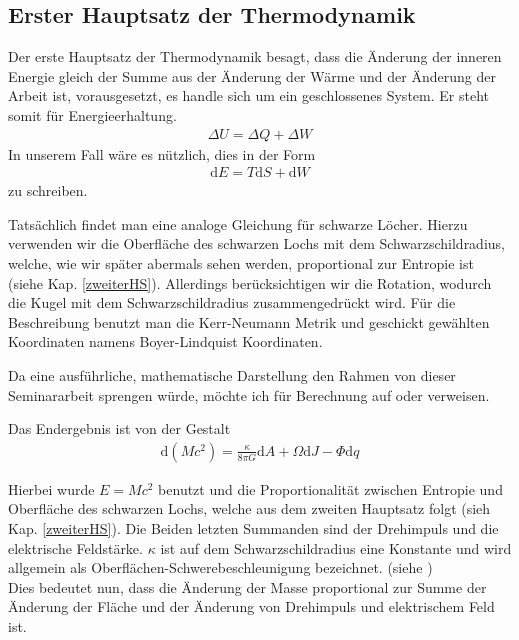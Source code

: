 \documentclass[ngerman]{scrartcl}
\newcommand{\diff}{\mathrm{d}}
\begin{document}
	\subsection{Erster Hauptsatz der Thermodynamik}
	Der erste Hauptsatz der Thermodynamik besagt, dass die Änderung der inneren Energie gleich der Summe aus der Änderung der Wärme und der Änderung der Arbeit ist, vorausgesetzt, es handle sich um ein geschlossenes System. Er steht somit für Energieerhaltung.
		\begin{align}
			\Delta U = \Delta Q + \Delta W
		\end{align}
	In unserem Fall wäre es nützlich, dies in der Form
		\begin{align}
			\diff E = T\diff S + \diff W
		\end{align} 
	zu schreiben. 
	
	Tatsächlich findet man eine analoge Gleichung für schwarze Löcher.
	Hierzu verwenden wir die Oberfläche des schwarzen Lochs mit dem Schwarzschildradius, welche, wie wir später abermals sehen werden, proportional zur Entropie ist (siehe Kap. \ref{zweiterHS}). Allerdings berücksichtigen wir die Rotation, wodurch die Kugel mit dem Schwarzschildradius zusammengedrückt wird. Für die Beschreibung benutzt man die Kerr-Neumann Metrik und geschickt gewählten Koordinaten namens Boyer-Lindquist Koordinaten.
	
	Da eine ausführliche, mathematische Darstellung den Rahmen von dieser Seminararbeit sprengen würde, möchte ich für Berechnung auf \cite{BekensteinHawking} oder \cite{Gebhardt} verweisen.
	
	Das Endergebnis ist von der Gestalt
		\begin{align} \label{1HS}
			\diff (Mc^2) = \frac{\kappa}{8 \pi G} \diff A + \Omega \diff J - \Phi \diff q
		\end{align} 
	
	Hierbei wurde $E = Mc^2$ benutzt und die Proportionalität zwischen Entropie und Oberfläche des schwarzen Lochs, welche aus dem zweiten Hauptsatz folgt (sieh Kap. \ref{zweiterHS}). Die Beiden letzten Summanden sind der Drehimpuls und die elektrische Feldstärke. $\kappa$ ist auf dem Schwarzschildradius eine Konstante und wird allgemein als Oberflächen-Schwerebeschleunigung bezeichnet. (siehe \cite{Gebhardt})
	\\
	
	Dies bedeutet nun, dass die Änderung der Masse proportional zur Summe der Änderung der Fläche und der Änderung von Drehimpuls und elektrischem Feld ist.
\end{document}
